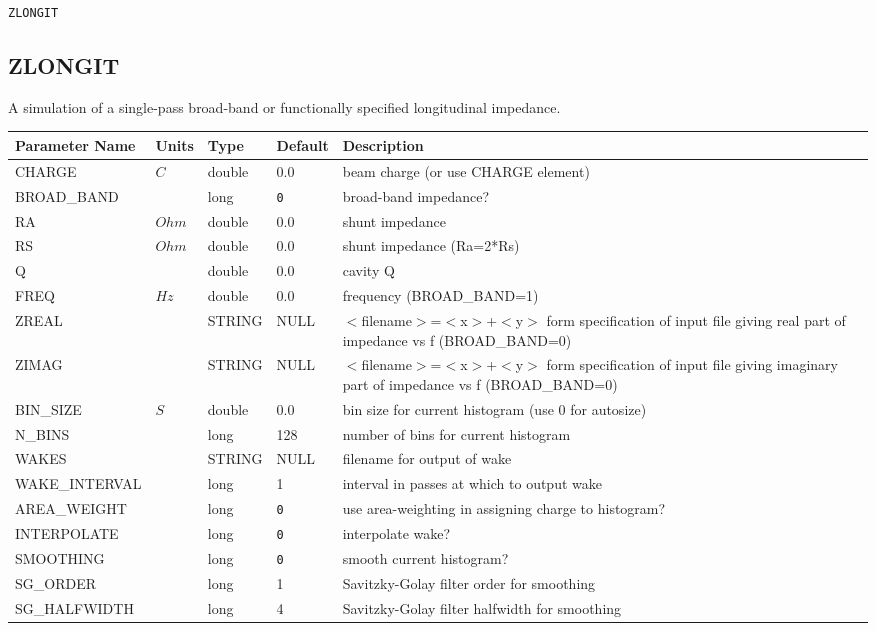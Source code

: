 \begin{latexonly}
\newpage
\begin{center}{\Large\verb|ZLONGIT|}\end{center}
\end{latexonly}\subsection{ZLONGIT}
A simulation of a single-pass broad-band or functionally specified longitudinal
impedance.
\\
\begin{tabular}{|l|l|l|l|p{\descwidth}|} \hline
Parameter Name & Units & Type & Default & Description \\ \hline 
CHARGE & $C$ & double &  0.0 & beam charge (or use CHARGE element)  \\ \hline 
BROAD\_BAND &  & long &  \verb|0| & broad-band impedance?  \\ \hline 
RA & $Ohm$ & double &  0.0 & shunt impedance  \\ \hline 
RS & $Ohm$ & double &  0.0 & shunt impedance (Ra=2*Rs)  \\ \hline 
Q &  & double &  0.0 & cavity Q  \\ \hline 
FREQ & $Hz$ & double &  0.0 & frequency (BROAD\_BAND=1)  \\ \hline 
ZREAL &  & STRING &   NULL            & $<$filename$>$=$<$x$>$+$<$y$>$ form specification of input file giving real part of impedance vs f (BROAD\_BAND=0)  \\ \hline 
ZIMAG &  & STRING &   NULL            & $<$filename$>$=$<$x$>$+$<$y$>$ form specification of input file giving imaginary part of impedance vs f (BROAD\_BAND=0)  \\ \hline 
BIN\_SIZE & $S$ & double &  0.0 & bin size for current histogram (use 0 for autosize)  \\ \hline 
N\_BINS &  & long &   128             & number of bins for current histogram  \\ \hline 
WAKES &  & STRING &   NULL            & filename for output of wake  \\ \hline 
WAKE\_INTERVAL &  & long &   1               & interval in passes at which to output wake  \\ \hline 
AREA\_WEIGHT &  & long &  \verb|0| & use area-weighting in assigning charge to histogram?  \\ \hline 
INTERPOLATE &  & long &  \verb|0| & interpolate wake?  \\ \hline 
SMOOTHING &  & long &  \verb|0| & smooth current histogram?  \\ \hline 
SG\_ORDER &  & long &   1               & Savitzky-Golay filter order for smoothing  \\ \hline 
SG\_HALFWIDTH &  & long &   4               & Savitzky-Golay filter halfwidth for smoothing  \\ \hline 
\end{tabular}

